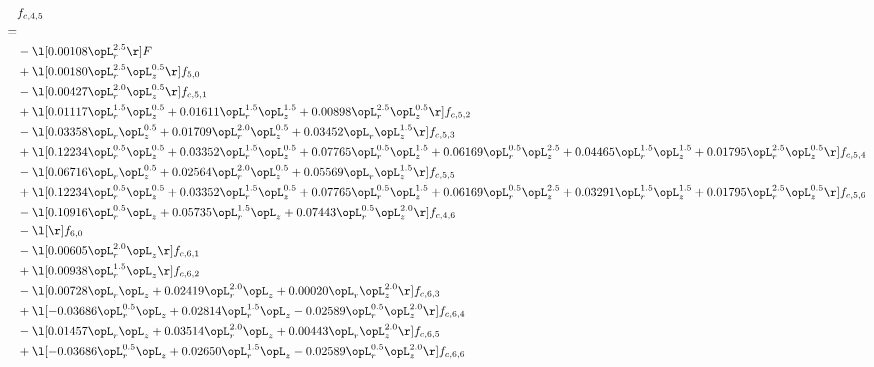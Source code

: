 \begin{alignat}{2} 
\label{eq:f_45_2} 
& f_{c,4,5} \nonumber \\ 
 = \\ 
& - \l[  0.00108 \opL_r^{2.5}  \r] F \nonumber \\ 
& + \l[  0.00180 \opL_r^{2.5} \opL_z^{0.5}  \r] f_{5,0} \nonumber \\ 
& - \l[  0.00427 \opL_r^{2.0} \opL_z^{0.5}  \r] f_{c,5,1} \nonumber \\ 
& + \l[  0.01117 \opL_r^{1.5} \opL_z^{0.5} +  0.01611 \opL_r^{1.5} \opL_z^{1.5} +  0.00898 \opL_r^{2.5} \opL_z^{0.5}  \r] f_{c,5,2} \nonumber \\ 
& - \l[  0.03358 \opL_r \opL_z^{0.5} +  0.01709 \opL_r^{2.0} \opL_z^{0.5} +  0.03452 \opL_r \opL_z^{1.5}  \r] f_{c,5,3} \nonumber \\ 
& + \l[  0.12234 \opL_r^{0.5} \opL_z^{0.5} +  0.03352 \opL_r^{1.5} \opL_z^{0.5} +  0.07765 \opL_r^{0.5} \opL_z^{1.5} +  0.06169 \opL_r^{0.5} \opL_z^{2.5} +  0.04465 \opL_r^{1.5} \opL_z^{1.5} +  0.01795 \opL_r^{2.5} \opL_z^{0.5}  \r] f_{c,5,4} \nonumber \\ 
& - \l[  0.06716 \opL_r \opL_z^{0.5} +  0.02564 \opL_r^{2.0} \opL_z^{0.5} +  0.05569 \opL_r \opL_z^{1.5}  \r] f_{c,5,5} \nonumber \\ 
& + \l[  0.12234 \opL_r^{0.5} \opL_z^{0.5} +  0.03352 \opL_r^{1.5} \opL_z^{0.5} +  0.07765 \opL_r^{0.5} \opL_z^{1.5} +  0.06169 \opL_r^{0.5} \opL_z^{2.5} +  0.03291 \opL_r^{1.5} \opL_z^{1.5} +  0.01795 \opL_r^{2.5} \opL_z^{0.5}  \r] f_{c,5,6} \nonumber \\ 
& - \l[  0.10916 \opL_r^{0.5} \opL_z +  0.05735 \opL_r^{1.5} \opL_z +  0.07443 \opL_r^{0.5} \opL_z^{2.0}  \r] f_{c,4,6} \nonumber \\ 
& - \l[  \r] f_{6,0} \nonumber \\ 
& - \l[  0.00605 \opL_r^{2.0} \opL_z  \r] f_{c,6,1} \nonumber \\ 
& + \l[  0.00938 \opL_r^{1.5} \opL_z  \r] f_{c,6,2} \nonumber \\ 
& - \l[  0.00728 \opL_r \opL_z +  0.02419 \opL_r^{2.0} \opL_z +  0.00020 \opL_r \opL_z^{2.0}  \r] f_{c,6,3} \nonumber \\ 
& + \l[  -0.03686 \opL_r^{0.5} \opL_z +  0.02814 \opL_r^{1.5} \opL_z   -0.02589 \opL_r^{0.5} \opL_z^{2.0}  \r] f_{c,6,4} \nonumber \\ 
& - \l[  0.01457 \opL_r \opL_z +  0.03514 \opL_r^{2.0} \opL_z +  0.00443 \opL_r \opL_z^{2.0}  \r] f_{c,6,5} \nonumber \\ 
& + \l[  -0.03686 \opL_r^{0.5} \opL_z +  0.02650 \opL_r^{1.5} \opL_z   -0.02589 \opL_r^{0.5} \opL_z^{2.0}  \r] f_{c,6,6} \nonumber \\ 
\end{alignat} 


